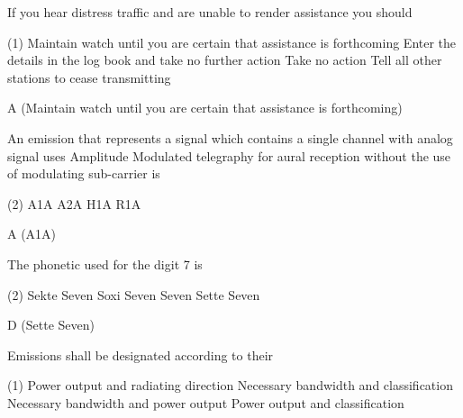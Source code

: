 \documentclass[a4paper]{article}
\begin{document}
\begin{question}If you hear distress traffic and are unable to render assistance you should
	\begin{tasks}(1)
		\task Maintain watch until you are certain that assistance is forthcoming
		\task Enter the details in the log book and take no further action
		\task Take no action
		\task Tell all other stations to cease transmitting
	\end{tasks}
\end{question}

\begin{solution}
	A (Maintain watch until you are certain that assistance is forthcoming)
\end{solution}

\vspace{5mm}



\begin{question}An emission that represents a signal which contains a single channel with analog signal uses Amplitude Modulated telegraphy for aural reception without the use of modulating sub-carrier is
	\begin{tasks}(2)
		\task A1A
		\task A2A
		\task H1A
		\task R1A
	\end{tasks}
\end{question}

\begin{solution}
	A (A1A)
\end{solution}

\vspace{5mm}



\begin{question}The phonetic used for the digit 7 is
	\begin{tasks}(2)
		\task Sekte Seven
		\task Soxi Seven
		\task Seven
		\task Sette Seven
	\end{tasks}
\end{question}

\begin{solution}
	D (Sette Seven)
\end{solution}

\vspace{5mm}



\begin{question}Emissions shall be designated according to their
	\begin{tasks}(1)
		\task Power output and radiating direction
		\task Necessary bandwidth and classification
		\task Necessary bandwidth and power output
		\task Power output and classification
	\end{tasks}
\end{question}
\end{document}
